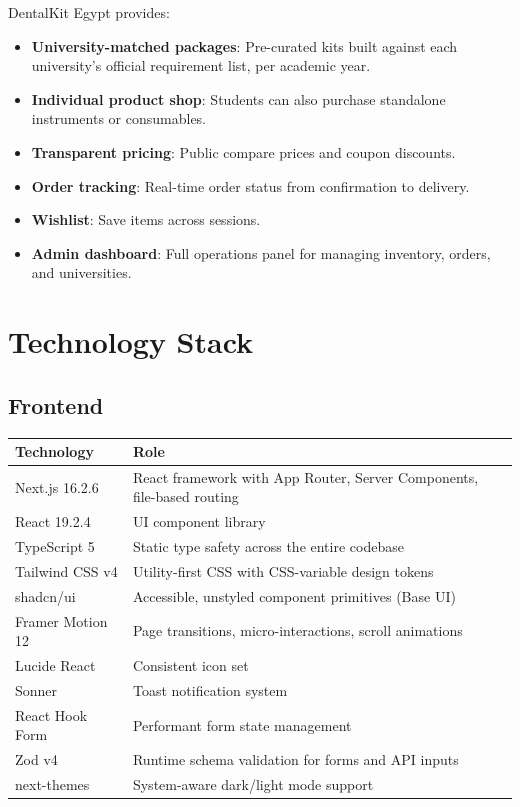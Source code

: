 \documentclass[12pt, a4paper]{article}
\begin{document}
DentalKit Egypt provides:

\begin{itemize}[leftmargin=*]
  \item \textbf{University-matched packages}: Pre-curated kits built against each university's official requirement list, per academic year.
  \item \textbf{Individual product shop}: Students can also purchase standalone instruments or consumables.
  \item \textbf{Transparent pricing}: Public compare prices and coupon discounts.
  \item \textbf{Order tracking}: Real-time order status from confirmation to delivery.
  \item \textbf{Wishlist}: Save items across sessions.
  \item \textbf{Admin dashboard}: Full operations panel for managing inventory, orders, and universities.
\end{itemize}

\section{Technology Stack}

\subsection{Frontend}

\begin{tabularx}{\textwidth}{@{}lX@{}}
\toprule
\textbf{Technology} & \textbf{Role} \\
\midrule
Next.js 16.2.6      & React framework with App Router, Server Components, file-based routing \\
React 19.2.4        & UI component library \\
TypeScript 5        & Static type safety across the entire codebase \\
Tailwind CSS v4     & Utility-first CSS with CSS-variable design tokens \\
shadcn/ui           & Accessible, unstyled component primitives (Base UI) \\
Framer Motion 12    & Page transitions, micro-interactions, scroll animations \\
Lucide React        & Consistent icon set \\
Sonner              & Toast notification system \\
React Hook Form     & Performant form state management \\
Zod v4              & Runtime schema validation for forms and API inputs \\
next-themes         & System-aware dark/light mode support \\
\bottomrule
\end{tabularx}
\end{document}
